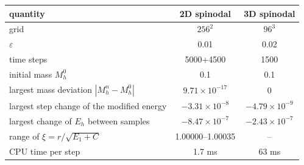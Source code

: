 \begin{tabular}{>{\raggedright\arraybackslash}p{} cc}
\toprule
quantity & 2D spinodal & 3D spinodal\\
\midrule
grid & $256^2$ & $96^3$\\
$\varepsilon$ & 0.01 & 0.02\\
time steps & 5000+4500 & 1500\\
initial mass $M_h^0$ & 0.1 & 0.1\\
largest mass deviation $|M_h^n-M_h^0|$ & $9.71{\times}10^{-17}$ & 0\\
largest step change of the modified energy & $-3.31{\times}10^{-8}$ & $-4.79{\times}10^{-9}$\\
largest change of $E_h$ between samples & $-8.47{\times}10^{-7}$ & $-2.43{\times}10^{-7}$\\
range of $\xi=r/\sqrt{E_1+C}$ & 1.00000--1.00035 & --\\
CPU time per step & 1.7 ms & 63 ms\\
\bottomrule
\end{tabular}
